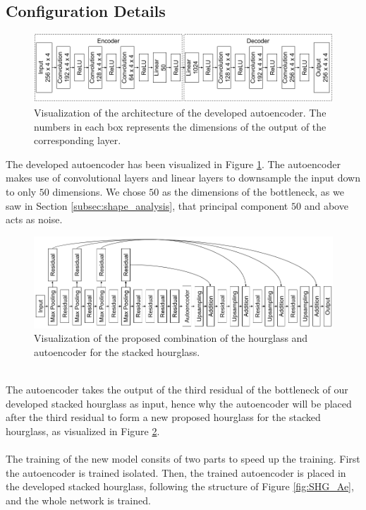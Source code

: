 \documentclass[./main.tex]{subfiles}
\begin{document}
\subsection{Configuration Details}
\begin{figure}[htbp]
    \centering
    \includegraphics[width = \textwidth]{entities/Ae_model.png}
    \caption{Visualization of the architecture of the developed autoencoder. The numbers in each box represents the dimensions of the output of the corresponding layer.}
    \label{fig:AE_model}
\end{figure}
The developed autoencoder has been visualized in Figure \ref{fig:AE_model}. The autoencoder makes use of convolutional layers and linear layers to downsample the input down to only $50$ dimensions. We chose $50$ as the dimensions of the bottleneck, as we saw in Section \ref{subsec:shape_analysis}, that principal component $50$ and above acts as noise.
\\
\begin{figure}[htbp]
    \centering
    \includegraphics[width = \textwidth]{entities/SHG_AE.png}
    \caption{Visualization of the proposed combination of the hourglass and autoencoder for the stacked hourglass.}
    \label{fig:SHG_AE}
\end{figure}
\\
The autoencoder takes the output of the third residual of the bottleneck of our developed stacked hourglass as input, hence why the autoencoder will be placed after the third residual to form a new proposed hourglass for the stacked hourglass, as visualized in Figure \ref{fig:SHG_AE}.
\\
\\
The training of the new model consits of two parts to speed up the training. First the autoencoder is trained isolated. Then, the trained autoencoder is placed in the developed stacked hourglass, following the structure of Figure \ref{fig:SHG_Ae}, and the whole network is trained.
\end{document}
